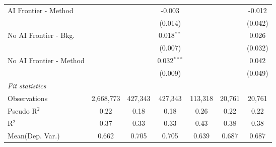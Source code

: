 \begin{tabular}{lcccccc}
   AI Frontier - Method    &               &               & -0.003        &               &               & -0.012\\   
                           &               &               & (0.014)       &               &               & (0.042)\\   
   No AI Frontier - Bkg.   &               &               & 0.018$^{**}$  &               &               & 0.026\\   
                           &               &               & (0.007)       &               &               & (0.032)\\   
   No AI Frontier - Method &               &               & 0.032$^{***}$ &               &               & 0.042\\   
                           &               &               & (0.009)       &               &               & (0.049)\\   
   \midrule
   \emph{Fit statistics}\\
   Observations            & 2,668,773     & 427,343       & 427,343       & 113,318       & 20,761        & 20,761\\  
   Pseudo R$^2$            & 0.22          & 0.18          & 0.18          & 0.26          & 0.22          & 0.22\\  
   R$^2$                   & 0.37          & 0.33          & 0.33          & 0.43          & 0.38          & 0.38\\  
Mean(Dep. Var.) & 0.662 & 0.705 & 0.705 & 0.639 & 0.687 & 0.687 \\
   

\end{tabular}
